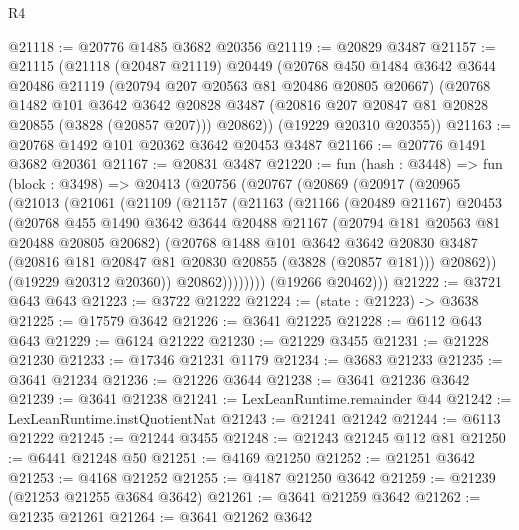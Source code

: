 \begin{lexlean}{R4}
\begin{coremodule}
@21118 := @20776 @1485 @3682 @20356
@21119 := @20829 @3487
@21157 := @21115
    (@21118
      (@20487 @21119)
      @20449
      (@20768
        @450
        @1484
        @3642
        @3644
        @20486
        @21119
        (@20794 @207 @20563 @81 @20486 @20805 @20667)
        (@20768
          @1482
          @101
          @3642
          @3642
          @20828
          @3487
          (@20816 @207 @20847 @81 @20828 @20855 (@3828 (@20857 @207)))
          @20862))
      (@19229 @20310 @20355))
@21163 := @20768 @1492 @101 @20362 @3642 @20453 @3487
@21166 := @20776 @1491 @3682 @20361
@21167 := @20831 @3487
@21220 := fun (hash : @3448) =>
  fun (block : @3498) =>
  @20413
    (@20756
      (@20767
        (@20869
          (@20917
            (@20965
              (@21013
                (@21061
                  (@21109
                    (@21157
                      (@21163
                        (@21166
                          (@20489 @21167)
                          @20453
                          (@20768
                            @455
                            @1490
                            @3642
                            @3644
                            @20488
                            @21167
                            (@20794 @181 @20563 @81 @20488 @20805 @20682)
                            (@20768
                              @1488
                              @101
                              @3642
                              @3642
                              @20830
                              @3487
                              (@20816 @181 @20847 @81 @20830 @20855 (@3828 (@20857 @181)))
                              @20862))
                          (@19229 @20312 @20360))
                        @20862))))))))
        (@19266 @20462)))
@21222 := @3721 @643 @643
@21223 := @3722 @21222
@21224 := (state : @21223) -> @3638
@21225 := @17579 @3642
@21226 := @3641 @21225
@21228 := @6112 @643 @643
@21229 := @6124 @21222
@21230 := @21229 @3455
@21231 := @21228 @21230
@21233 := @17346 @21231 @1179
@21234 := @3683 @21233
@21235 := @3641 @21234
@21236 := @21226 @3644
@21238 := @3641 @21236 @3642
@21239 := @3641 @21238
@21241 := LexLeanRuntime.remainder @44
@21242 := LexLeanRuntime.instQuotientNat
@21243 := @21241 @21242
@21244 := @6113 @21222
@21245 := @21244 @3455
@21248 := @21243 @21245 @112 @81
@21250 := @6441 @21248 @50
@21251 := @4169 @21250
@21252 := @21251 @3642
@21253 := @4168 @21252
@21255 := @4187 @21250 @3642
@21259 := @21239 (@21253 @21255 @3684 @3642)
@21261 := @3641 @21259 @3642
@21262 := @21235 @21261
@21264 := @3641 @21262 @3642

\end{coremodule}
\end{lexlean}
